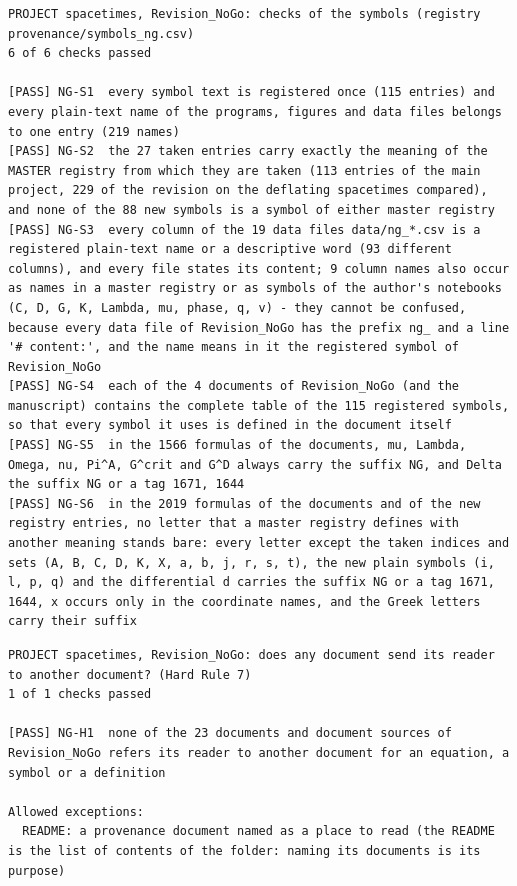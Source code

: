 \documentclass[
  10pt,
]{article}
\begin{document}
\begin{verbatim}
PROJECT spacetimes, Revision_NoGo: checks of the symbols (registry provenance/symbols_ng.csv)
6 of 6 checks passed

[PASS] NG-S1  every symbol text is registered once (115 entries) and every plain-text name of the programs, figures and data files belongs to one entry (219 names)
[PASS] NG-S2  the 27 taken entries carry exactly the meaning of the MASTER registry from which they are taken (113 entries of the main project, 229 of the revision on the deflating spacetimes compared), and none of the 88 new symbols is a symbol of either master registry
[PASS] NG-S3  every column of the 19 data files data/ng_*.csv is a registered plain-text name or a descriptive word (93 different columns), and every file states its content; 9 column names also occur as names in a master registry or as symbols of the author's notebooks (C, D, G, K, Lambda, mu, phase, q, v) - they cannot be confused, because every data file of Revision_NoGo has the prefix ng_ and a line '# content:', and the name means in it the registered symbol of Revision_NoGo
[PASS] NG-S4  each of the 4 documents of Revision_NoGo (and the manuscript) contains the complete table of the 115 registered symbols, so that every symbol it uses is defined in the document itself
[PASS] NG-S5  in the 1566 formulas of the documents, mu, Lambda, Omega, nu, Pi^A, G^crit and G^D always carry the suffix NG, and Delta the suffix NG or a tag 1671, 1644
[PASS] NG-S6  in the 2019 formulas of the documents and of the new registry entries, no letter that a master registry defines with another meaning stands bare: every letter except the taken indices and sets (A, B, C, D, K, X, a, b, j, r, s, t), the new plain symbols (i, l, p, q) and the differential d carries the suffix NG or a tag 1671, 1644, x occurs only in the coordinate names, and the Greek letters carry their suffix
\end{verbatim}

\begin{verbatim}
PROJECT spacetimes, Revision_NoGo: does any document send its reader to another document? (Hard Rule 7)
1 of 1 checks passed

[PASS] NG-H1  none of the 23 documents and document sources of Revision_NoGo refers its reader to another document for an equation, a symbol or a definition

Allowed exceptions:
  README: a provenance document named as a place to read (the README is the list of contents of the folder: naming its documents is its purpose)
\end{verbatim}
\end{document}
